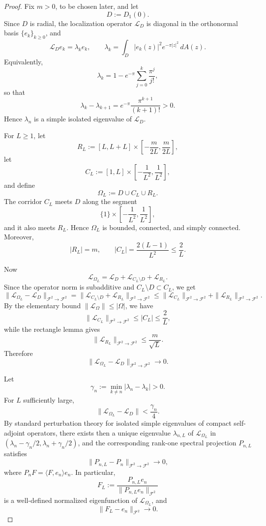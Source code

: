 \documentclass[a4paper,11pt,reqno]{amsart}
\begin{document}
\begin{proof}
Fix \(m>0\), to be chosen later, and let
\[
D:=D_1(0).
\]
Since \(D\) is radial, the localization operator \(\mathcal L_D\) is diagonal in
the orthonormal basis \(\{e_k\}_{k\geq 0}\), and
\[
\mathcal L_D e_k=\lambda_k e_k,
\qquad
\lambda_k=\int_D |e_k(z)|^2e^{-\pi |z|^2}\,dA(z).
\]
Equivalently,
\[
\lambda_k
=
1-e^{-\pi}\sum_{j=0}^k \frac{\pi^j}{j!},
\]
so that
\[
\lambda_k-\lambda_{k+1}
=
e^{-\pi}\frac{\pi^{k+1}}{(k+1)!}>0.
\]
Hence \(\lambda_n\) is a simple isolated eigenvalue of \(\mathcal L_D\).

For \(L\geq 1\), let
\[
R_L:=
\left[L,L+L\right]\times
\left[-\frac{m}{2L},\frac{m}{2L}\right],
\]
let
\[
C_L:=[1,L]\times \left[-\frac{1}{L^2},\frac{1}{L^2}\right],
\]
and define
\[
\Omega_L:=D\cup C_L\cup R_L.
\]
The corridor \(C_L\) meets \(D\) along the segment
\[
\{1\}\times \left[-\frac{1}{L^2},\frac{1}{L^2}\right],
\]
and it also meets \(R_L\). Hence \(\Omega_L\) is bounded, connected, and simply
connected. Moreover,
\[
|R_L|=m,
\qquad
|C_L|=\frac{2(L-1)}{L^2}\le \frac{2}{L}.
\]

Now
\[
\mathcal L_{\Omega_L}
=
\mathcal L_D+\mathcal L_{C_L\setminus D}+\mathcal L_{R_L}.
\]
Since the operator norm is subadditive and \(C_L\setminus D\subset C_L\), we get
\[
\|\mathcal L_{\Omega_L}-\mathcal L_D\|_{\mathcal F^2\to\mathcal F^2}
=
\|\mathcal L_{C_L\setminus D}+\mathcal L_{R_L}\|_{\mathcal F^2\to\mathcal F^2}
\le
\|\mathcal L_{C_L}\|_{\mathcal F^2\to\mathcal F^2}
+
\|\mathcal L_{R_L}\|_{\mathcal F^2\to\mathcal F^2}.
\]
By the elementary bound \(\|\mathcal L_\Omega\|\le |\Omega|\), we have
\[
\|\mathcal L_{C_L}\|_{\mathcal F^2\to\mathcal F^2}\le |C_L|\le \frac{2}{L},
\]
while the rectangle lemma gives
\[
\|\mathcal L_{R_L}\|_{\mathcal F^2\to\mathcal F^2}\le \frac{m}{\sqrt L}.
\]
Therefore
\[
\|\mathcal L_{\Omega_L}-\mathcal L_D\|_{\mathcal F^2\to\mathcal F^2}\to 0.
\]

Let
\[
\gamma_n:=\min_{k\neq n}|\lambda_n-\lambda_k|>0.
\]
For \(L\) sufficiently large,
\[
\|\mathcal L_{\Omega_L}-\mathcal L_D\|<\frac{\gamma_n}{4}.
\]
By standard perturbation theory for isolated simple eigenvalues of compact
self-adjoint operators, there exists then a unique eigenvalue
\(\lambda_{n,L}\) of \(\mathcal L_{\Omega_L}\) in
\((\lambda_n-\gamma_n/2,\lambda_n+\gamma_n/2)\), and the corresponding
rank-one spectral projection \(P_{n,L}\) satisfies
\[
\|P_{n,L}-P_n\|_{\mathcal F^2\to\mathcal F^2}\to 0,
\]
where \(P_nF=\langle F,e_n\rangle e_n\). In particular,
\[
F_L:=\frac{P_{n,L}e_n}{\|P_{n,L}e_n\|_{\mathcal F^2}}
\]
is a well-defined normalized eigenfunction of \(\mathcal L_{\Omega_L}\), and
\[
\|F_L-e_n\|_{\mathcal F^2}\to 0.
\]


\end{proof}
\end{document}
